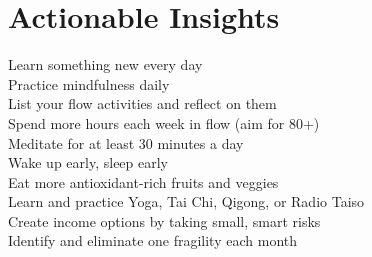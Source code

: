 \section*{Actionable Insights}
\begin{Form}
  \CheckBox[name=01]{} Learn something new every day\\
  \CheckBox[name=02]{} Practice mindfulness daily\\
  \CheckBox[name=03]{} List your flow activities and reflect on them\\
  \CheckBox[name=04]{} Spend more hours each week in flow (aim for 80+)\\
  \CheckBox[name=05]{} Meditate for at least 30 minutes a day\\
  \CheckBox[name=06]{} Wake up early, sleep early\\
  \CheckBox[name=07]{} Eat more antioxidant-rich fruits and veggies\\
  \CheckBox[name=08]{} Learn and practice Yoga, Tai Chi, Qigong, or Radio Taiso\\
  \CheckBox[name=09]{} Create income options by taking small, smart risks\\
  \CheckBox[name=10]{} Identify and eliminate one fragility each month 
\end{Form}
